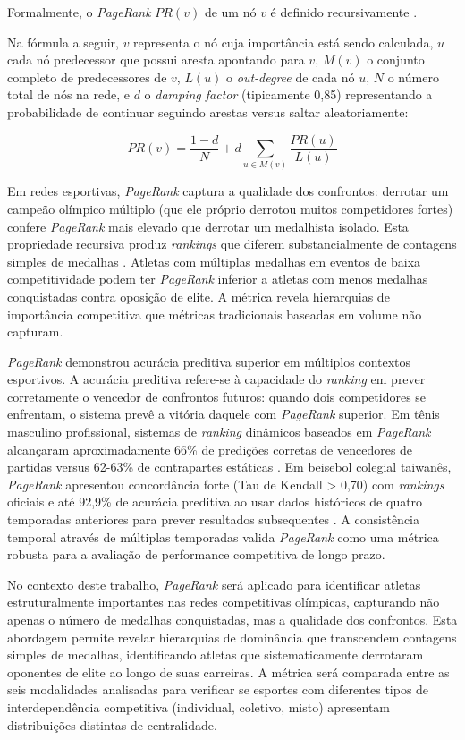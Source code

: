 Formalmente, o \textit{PageRank} $PR(v)$ de um nó $v$ é definido recursivamente \cite{Brin1998PageRank}.

Na fórmula a seguir, $v$ representa o nó cuja importância está sendo calculada, $u$ cada nó predecessor que possui aresta apontando para $v$, $M(v)$ o conjunto completo de predecessores de $v$, $L(u)$ o \textit{out-degree} de cada nó $u$, $N$ o número total de nós na rede, e $d$ o \textit{damping factor} (tipicamente 0,85) representando a probabilidade de continuar seguindo arestas versus saltar aleatoriamente:

\[
PR(v) = \frac{1-d}{N} + d \sum_{u \in M(v)} \frac{PR(u)}{L(u)}
\]

Em redes esportivas, \textit{PageRank}{} captura a qualidade dos confrontos: derrotar um campeão olímpico múltiplo (que ele próprio derrotou muitos competidores fortes) confere \textit{PageRank}{} mais elevado que derrotar um medalhista isolado. Esta propriedade recursiva produz \textit{rankings} que diferem substancialmente de contagens simples de medalhas \cite{brasnam2024F1, Shiue2025ApplyingPageRank}. Atletas com múltiplas medalhas em eventos de baixa competitividade podem ter \textit{PageRank}{} inferior a atletas com menos medalhas conquistadas contra oposição de elite. A métrica revela hierarquias de importância competitiva que métricas tradicionais baseadas em volume não capturam.

\textit{PageRank}{} demonstrou acurácia preditiva superior em múltiplos contextos esportivos. A acurácia preditiva refere-se à capacidade do \textit{ranking} em prever corretamente o vencedor de confrontos futuros: quando dois competidores se enfrentam, o sistema prevê a vitória daquele com \textit{PageRank}{} superior. Em tênis masculino profissional, sistemas de \textit{ranking} dinâmicos baseados em \textit{PageRank}{} alcançaram aproximadamente 66\% de predições corretas de vencedores de partidas versus 62-63\% de contrapartes estáticas \cite{Motegi2012NetworkBased}. Em beisebol colegial taiwanês, \textit{PageRank}{} apresentou concordância forte (Tau de Kendall > 0,70) com \textit{rankings} oficiais e até 92,9\% de acurácia preditiva ao usar dados históricos de quatro temporadas anteriores para prever resultados subsequentes \cite{Shiue2025ApplyingPageRank}. A consistência temporal através de múltiplas temporadas valida \textit{PageRank}{} como uma métrica robusta para a avaliação de performance competitiva de longo prazo.

No contexto deste trabalho, \textit{PageRank}{} será aplicado para identificar atletas estruturalmente importantes nas redes competitivas olímpicas, capturando não apenas o número de medalhas conquistadas, mas a qualidade dos confrontos. Esta abordagem permite revelar hierarquias de dominância que transcendem contagens simples de medalhas, identificando atletas que sistematicamente derrotaram oponentes de elite ao longo de suas carreiras. A métrica será comparada entre as seis modalidades analisadas para verificar se esportes com diferentes tipos de interdependência competitiva (individual, coletivo, misto) apresentam distribuições distintas de centralidade.

